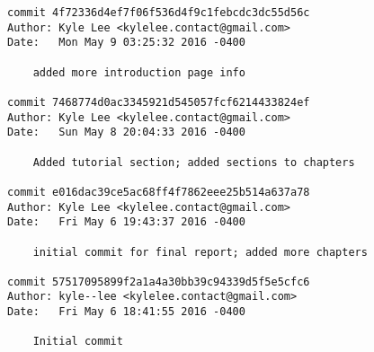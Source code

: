 \begin{lstlisting}[backgroundcolor=\color{white}]
commit 4f72336d4ef7f06f536d4f9c1febcdc3dc55d56c
Author: Kyle Lee <kylelee.contact@gmail.com>
Date:   Mon May 9 03:25:32 2016 -0400

    added more introduction page info

commit 7468774d0ac3345921d545057fcf6214433824ef
Author: Kyle Lee <kylelee.contact@gmail.com>
Date:   Sun May 8 20:04:33 2016 -0400

    Added tutorial section; added sections to chapters

commit e016dac39ce5ac68ff4f7862eee25b514a637a78
Author: Kyle Lee <kylelee.contact@gmail.com>
Date:   Fri May 6 19:43:37 2016 -0400

    initial commit for final report; added more chapters

commit 57517095899f2a1a4a30bb39c94339d5f5e5cfc6
Author: kyle--lee <kylelee.contact@gmail.com>
Date:   Fri May 6 18:41:55 2016 -0400

    Initial commit

    \end{lstlisting}